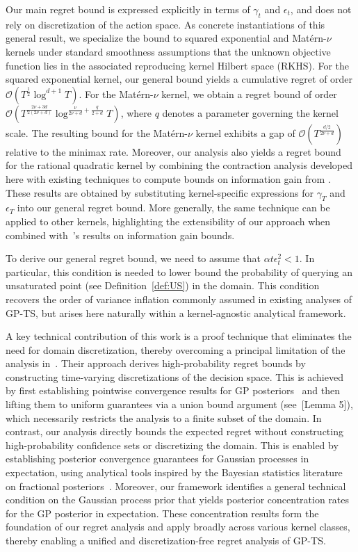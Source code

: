 \documentclass[final,12pt]{colt2026} %
\begin{document}
Our main regret bound is expressed explicitly in terms of $\gamma_t$ and $\epsilon_t$, and does not rely on discretization of the action space. As concrete instantiations of this general result, we specialize the bound to squared exponential and Mat\'ern-$\nu$ kernels under standard smoothness assumptions that the unknown objective function lies in the associated reproducing kernel Hilbert space (RKHS). For the squared exponential kernel, our general bound yields a cumulative regret of order $\mathcal{O}(T^{\frac{1}{2}}\log^{d+1} T)$. For the Mat\'ern-$\nu$ kernel, we obtain a regret bound of order $\mathcal{O}(T^{\frac{2\nu+3d}{2(2\nu+d)}} \log^{\frac{\nu}{2\nu+d} + \frac{q}{2+d}} T)$, where $q$ denotes a parameter governing the kernel scale. The resulting bound for the Mat\'{e}rn-$\nu$ kernel exhibits a gap of $\mathcal{O}(T^{\frac{d/2}{2\nu+d}})$ relative to the minimax rate. Moreover, our analysis also yields a regret bound for the rational quadratic kernel by combining the contraction analysis developed here with existing techniques to compute bounds on information gain from \cite{vakili21a}. These results are obtained by substituting kernel-specific expressions for $\gamma_T$ and $\epsilon_T$ into our general regret bound. More generally, the same technique can be applied to other kernels, highlighting the extensibility of our approach when combined with~\cite{vakili21a}'s results on information gain bounds. 

To derive our general regret bound, we need to assume that $\alpha t \epsilon_t^2 < 1$. In particular, this condition is needed to lower bound the probability of querying an unsaturated point (see Definition~\ref{def:US}) in the domain. This condition recovers the order of variance inflation commonly assumed in existing analyses of GP-TS, but arises here naturally within a kernel-agnostic analytical framework.  


A key technical contribution of this work is a proof technique that eliminates the need for domain discretization, thereby overcoming a principal limitation of the analysis in~\cite{Ray&Gopalan2017}. Their approach derives high-probability regret bounds by constructing time-varying discretizations of the decision space. This is achieved by first establishing pointwise convergence results for GP posteriors~\citep{hoffman2013stochastic} and then lifting them to uniform guarantees via a union bound argument (see~\cite{Ray&Gopalan2017}[Lemma 5]), which necessarily restricts the analysis to a finite subset of the domain. In contrast, our analysis directly bounds the expected regret without constructing high-probability confidence sets or discretizing the domain. This is enabled by establishing posterior convergence guarantees for Gaussian processes in expectation, using analytical tools inspired by the Bayesian statistics literature on fractional posteriors~\citep{bhattacharya2019bayesian}. Moreover, our framework identifies a general technical condition on the Gaussian process prior that yields posterior concentration rates for the GP posterior in expectation. These concentration results form the foundation of our regret analysis and apply broadly across various kernel classes, thereby enabling a unified and discretization-free regret analysis of GP-TS.
\end{document}
